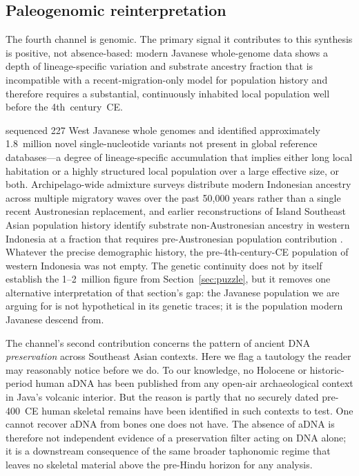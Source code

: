 \documentclass[12pt,a4paper]{article}
\begin{document}
\subsection{Paleogenomic reinterpretation}
\label{sec:ch4}

The fourth channel is genomic. The primary signal it contributes to this synthesis is positive, not absence-based: modern Javanese whole-genome data shows a depth of lineage-specific variation and substrate ancestry fraction that is incompatible with a recent-migration-only model for population history and therefore requires a substantial, continuously inhabited local population well before the 4th~century~CE.

\citet{maulana2024} sequenced 227 West Javanese whole genomes and identified approximately 1.8~million novel single-nucleotide variants not present in global reference databases---a degree of lineage-specific accumulation that implies either long local habitation or a highly structured local population over a large effective size, or both. Archipelago-wide admixture surveys \citep{lipson2018,larena2021} distribute modern Indonesian ancestry across multiple migratory waves over the past 50{,}000 years rather than a single recent Austronesian replacement, and earlier reconstructions of Island Southeast Asian population history identify substrate non-Austronesian ancestry in western Indonesia at a fraction that requires pre-Austronesian population contribution \citep{lipson2014}. Whatever the precise demographic history, the pre-4th-century-CE population of western Indonesia was not empty. The genetic continuity does not by itself establish the 1--2~million figure from Section~\ref{sec:puzzle}, but it removes one alternative interpretation of that section's gap: the Javanese population we are arguing for is not hypothetical in its genetic traces; it is the population modern Javanese descend from.

The channel's second contribution concerns the pattern of ancient DNA \textit{preservation} across Southeast Asian contexts. Here we flag a tautology the reader may reasonably notice before we do. To our knowledge, no Holocene or historic-period human aDNA has been published from any open-air archaeological context in Java's volcanic interior. But the reason is partly that no securely dated pre-400~CE human skeletal remains have been identified in such contexts to test. One cannot recover aDNA from bones one does not have. The absence of aDNA is therefore not independent evidence of a preservation filter acting on DNA alone; it is a downstream consequence of the same broader taphonomic regime that leaves no skeletal material above the pre-Hindu horizon for any analysis.
\end{document}
